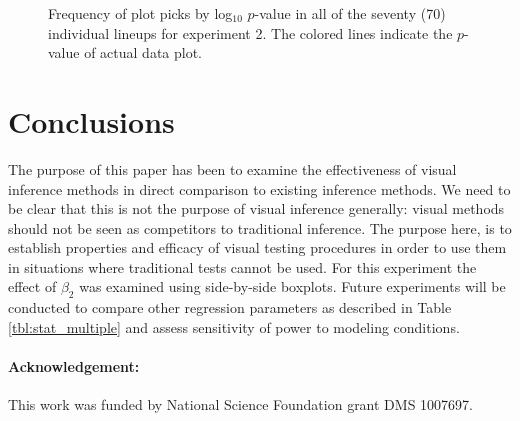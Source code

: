 \documentclass{article}
\begin{document}
\begin{figure}[hbtp]
   \centering
       \caption{Frequency of plot picks by log$_{10}$ $p$-value in all of the seventy (70) individual lineups for experiment 2. The colored lines indicate the $p$-value of actual data plot.}
       \label{fig:P-val_log2}
\end{figure}


\section{Conclusions}

The purpose of this paper has been to examine the effectiveness of visual inference methods in direct comparison to existing inference methods. We need to be clear that this is not the purpose of visual inference generally: visual methods should not be seen as competitors to traditional inference.  The purpose here, is to  establish properties and  efficacy of visual testing procedures in order to use them in situations where traditional tests cannot be used. For this experiment the effect of $\beta_2$ was examined using side-by-side boxplots. Future experiments will be conducted to compare other regression parameters as described in Table \ref{tbl:stat_multiple} and assess sensitivity of power to modeling conditions.

\paragraph{Acknowledgement:}

This work was funded by National Science Foundation grant DMS 1007697.
\end{document}
